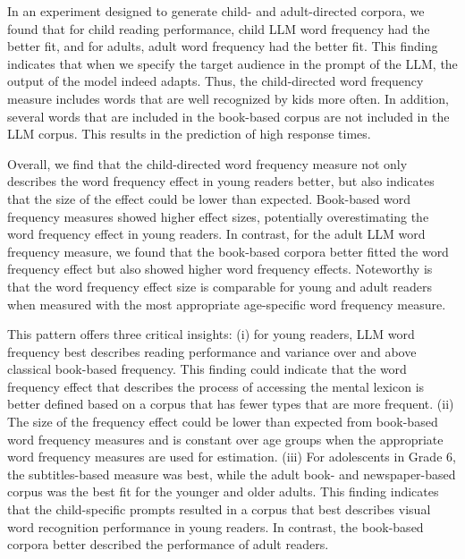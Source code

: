 \documentclass[doc, a4paper]{apa7}
\begin{document}
In an experiment designed to generate child- and adult-directed corpora, we found that for child reading performance, child LLM word frequency had the better fit, and for adults, adult word frequency had the better fit. This finding indicates that when we specify the target audience in the prompt of the LLM, the output of the model indeed adapts. Thus, the child-directed word frequency measure includes words that are well recognized by kids more often. In addition, several words that are included in the book-based corpus are not included in the LLM corpus. This results in the prediction of high response times. 

Overall, we find that the child-directed word frequency measure not only describes the word frequency effect in young readers better, but also indicates that the size of the effect could be lower than expected. Book-based word frequency measures showed higher effect sizes, potentially overestimating the word frequency effect in young readers. In contrast, for the adult LLM word frequency measure, we found that the book-based corpora better fitted the word frequency effect but also showed higher word frequency effects. Noteworthy is that the word frequency effect size is comparable for young and adult readers when measured with the most appropriate age-specific word frequency measure. 

This pattern offers three critical insights: (i) for young readers, LLM word frequency best describes reading performance and variance over and above classical book-based frequency. This finding could indicate that the word frequency effect that describes the process of accessing the mental lexicon \citep{brysbaert_word_2018, brysbaert_word_2011, gregorova_access_2023} is better defined based on a corpus that has fewer types that are more frequent. (ii) The size of the frequency effect could be lower than expected from book-based word frequency measures and is constant over age groups when the appropriate word frequency measures are used for estimation. 
(iii) For adolescents in Grade 6, the subtitles-based measure was best, while the adult book- and newspaper-based corpus was the best fit for the younger and older adults. This finding indicates that the child-specific prompts resulted in a corpus that best describes visual word recognition performance in young readers. In contrast, the book-based corpora better described the performance of adult readers.  
\end{document}
